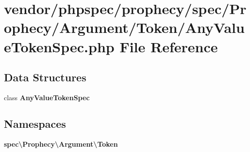 \section{vendor/phpspec/prophecy/spec/\+Prophecy/\+Argument/\+Token/\+Any\+Value\+Token\+Spec.php File Reference}
\label{_any_value_token_spec_8php}
\subsection*{Data Structures}
\begin{DoxyCompactItemize}
\item 
class {\bf Any\+Value\+Token\+Spec}
\end{DoxyCompactItemize}
\subsection*{Namespaces}
\begin{DoxyCompactItemize}
\item 
 {\bf spec\textbackslash{}\+Prophecy\textbackslash{}\+Argument\textbackslash{}\+Token}
\end{DoxyCompactItemize}
